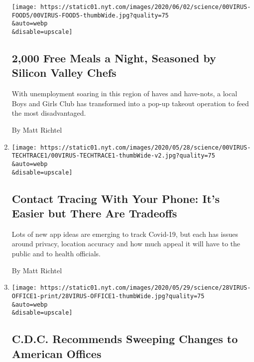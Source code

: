 \begin{enumerate}
  \texttt{[image: https://static01.nyt.com/images/2020/06/02/science/00VIRUS-FOOD5/00VIRUS-FOOD5-thumbWide.jpg?quality=75\\\&auto=webp\\\&disable=upscale]}

  \hypertarget{2000-free-meals-a-night-seasoned-by-silicon-valley-chefs}{%
  \subsection{2,000 Free Meals a Night, Seasoned by Silicon Valley
  Chefs}\label{2000-free-meals-a-night-seasoned-by-silicon-valley-chefs}}

  With unemployment soaring in this region of haves and have-nots, a
  local Boys and Girls Club has transformed into a pop-up takeout
  operation to feed the most disadvantaged.

  By Matt Richtel
\item
  \href{/2020/06/03/health/coronavirus-contact-tracing-apps.html}{}

  \texttt{[image: https://static01.nyt.com/images/2020/05/28/science/00VIRUS-TECHTRACE1/00VIRUS-TECHTRACE1-thumbWide-v2.jpg?quality=75\\\&auto=webp\\\&disable=upscale]}

  \hypertarget{contact-tracing-with-your-phone-its-easier-but-there-are-tradeoffs}{%
  \subsection{Contact Tracing With Your Phone: It's Easier but There Are
  Tradeoffs}\label{contact-tracing-with-your-phone-its-easier-but-there-are-tradeoffs}}

  Lots of new app ideas are emerging to track Covid-19, but each has
  issues around privacy, location accuracy and how much appeal it will
  have to the public and to health officials.

  By Matt Richtel
\item
  \href{/2020/05/28/health/cdc-coronavirus-offices.html}{}

  \texttt{[image: https://static01.nyt.com/images/2020/05/29/science/28VIRUS-OFFICE1-print/28VIRUS-OFFICE1-thumbWide.jpg?quality=75\\\&auto=webp\\\&disable=upscale]}

  \hypertarget{cdc-recommends-sweeping-changes-to-american-offices}{%
  \subsection{C.D.C. Recommends Sweeping Changes to American
  Offices}\label{cdc-recommends-sweeping-changes-to-american-offices}}


\end{enumerate}
